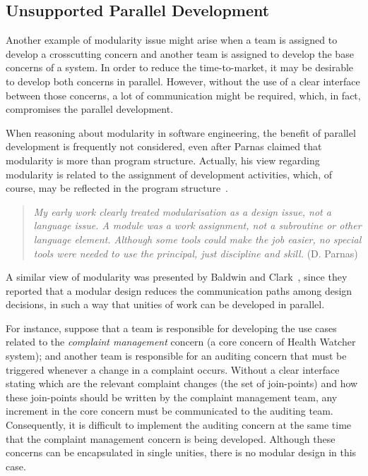 \subsection{Unsupported Parallel Development}

Another example of modularity issue might arise when a team is
assigned to develop a crosscutting concern and another team is
assigned to develop the base concerns of a system. In order to
reduce the time-to-market, it may be desirable to develop both
concerns in parallel. However, without the use of a clear interface
between those concerns, a lot of communication might be required,
which, in fact, compromises the parallel development.

When reasoning about modularity in software engineering,
the benefit of parallel development is frequently not considered, even after
Parnas claimed that modularity is more than program structure. Actually,
his view regarding modularity is related to the assignment of development
activities, which, of course, may be reflected in the program
structure~\cite{parnas-icse-03}.

\begin{quote}\emph{
My early work clearly treated modularisation as a design
issue, not a language issue. A module was a work assignment,
not a subroutine or other language element. Although
some tools could make the job easier, no special tools were
needed to use the principal, just discipline and skill.}
(D. Parnas)
\end{quote}



A similar view of modularity was presented by Baldwin and
Clark~\cite{clark-design-rules-book},  since they
reported that a modular design reduces the communication paths among
design decisions, in such a way that unities of work can be developed
in parallel.

For instance, suppose that a team is responsible for developing
the use cases related to the \emph{complaint management} concern (a core concern
of Health Watcher system); and another team is responsible
for an auditing concern that must be triggered whenever a change in a
complaint occurs. Without a clear interface stating which are the relevant
complaint changes (the set of join-points) and how these join-points should be
written by the complaint management team, any increment in the core concern
must be communicated to the auditing team. Consequently, it is difficult to
implement the auditing concern at the same time that the complaint management
concern is being developed. Although these concerns can be encapsulated in
single unities, there is no modular design in this case.

